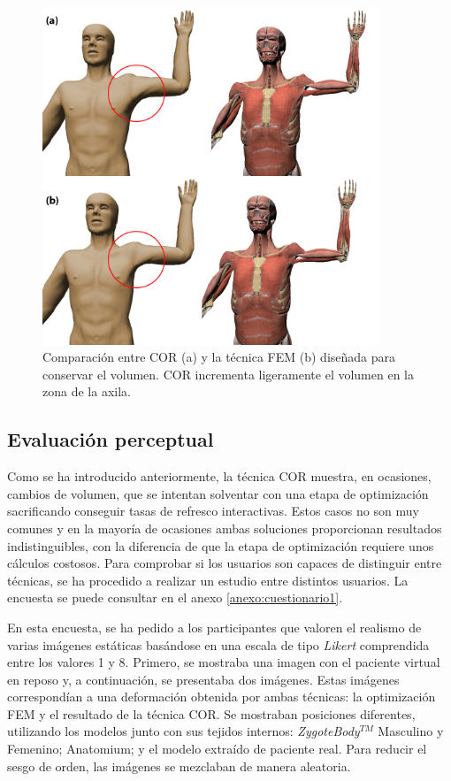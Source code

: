 \begin{figure}[h]%
   \centering
   \includegraphics[width=0.9\textwidth]{IMG/AntCOR}
    \caption{ Comparación entre \ac{COR} (a) y la técnica \ac{FEM} (b) diseñada para conservar el volumen. \ac{COR} incrementa ligeramente el volumen en la zona de la axila.}
    \label{fig:anatomium}
\end{figure}

\subsection{Evaluación perceptual}


%
Como se ha introducido anteriormente, la técnica \ac{COR} muestra, en ocasiones, cambios de volumen, que se intentan solventar con una etapa de optimización sacrificando conseguir tasas de refresco interactivas. Estos casos no son muy comunes y en la mayoría de ocasiones ambas soluciones proporcionan resultados indistinguibles, con la diferencia de que la etapa de optimización requiere unos cálculos costosos. 
Para comprobar si los usuarios son capaces de distinguir entre técnicas, se ha procedido a realizar un estudio entre distintos usuarios. La encuesta se puede consultar en el anexo \ref{anexo:cuestionario1}.

En esta encuesta, se ha pedido a los participantes que valoren el realismo de varias imágenes estáticas basándose en una escala de tipo \emph{Likert} comprendida entre los valores 1 y 8. Primero, se mostraba una imagen con el paciente virtual en reposo
y, a continuación, se presentaba dos  imágenes. Estas imágenes correspondían a una deformación obtenida por ambas técnicas: la optimización \ac{FEM} y el resultado de la técnica \ac{COR}. Se mostraban posiciones diferentes, utilizando los modelos junto con sus tejidos internos: \emph{ZygoteBody}$^{TM}$ Masculino y Femenino; Anatomium; y el modelo extraído de paciente real. Para reducir el sesgo de orden, las imágenes se mezclaban de manera aleatoria.



